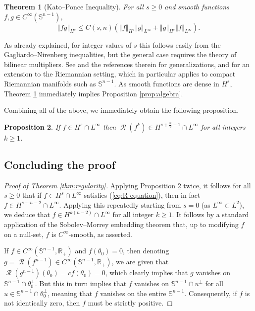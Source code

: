 \documentclass[11pt]{article}
\newtheorem{thm}{Theorem}[section]
\newtheorem{proposition}[thm]{Proposition}
\theoremstyle{definition}
\theoremstyle{proof}
\DeclareMathOperator{\+}{\mathop{\tilde{+}}}
\DeclareMathOperator{\Rad}{\mathcal{R}}
\newcommand{\norm}[1]{\left\Vert#1\right\Vert}
\newcommand{\brac}[1]{\left(#1\right)}
\newcommand{\R}{\mathbb{R}}
\renewcommand{\S}{\mathbb{S}}
\numberwithin{equation}{section}
\numberwithin{equation}{section}
\begin{document}
\begin{thm}[Kato--Ponce Inequality] \label{thm:Kato-Ponce}
For all $s \geq 0$ and smooth functions $f, g \in C^\infty(\S^{n-1})$,
\[
\norm{f g}_{H^s} \leq C(s,n) \brac{ \norm{f}_{H^s} \norm{g}_{L^\infty} + \norm{g}_{H^s} \norm{f}_{L^\infty} } .
\]
\end{thm}
As already explained, for integer values of $s$ this follows easily from the Gagliardo--Nirenberg inequalities, but the general case requires the theory of bilinear multipliers. See \cite[Theorem 7.6.1]{Grafakaos-ModernFourierAnalysis3rdEd} and the references therein for generalizations, and \cite[Theorem 25]{CoulhonEtAl-SobolevAlgebras} for an extension to the Riemannian setting, which in particular applies to compact Riemannian manifolds such as $\S^{n-1}$. 
As smooth functions are dense in $H^s$, Theorem \ref{thm:Kato-Ponce} immediately implies Proposition \ref{prop:algebra}. 


\medskip

Combining all of the above, we immediately obtain the following proposition. 
\begin{proposition} \label{prop:Rfk}
If $f \in H^{s} \cap L^\infty$ then $\Rad(f^k) \in H^{s + \frac{n}{2} - 1} \cap L^\infty$ for all integers $k \geq 1$. 
\end{proposition}

\subsection{Concluding the proof}

\begin{proof}[Proof of Theorem \ref{thm:regularity}]
Applying Proposition \ref{prop:Rfk} twice, it follows for all $s\geq 0$ that if $f \in H^s \cap L^\infty$ satisfies (\ref{eq:R-equation}), then in fact $f \in H^{s + n -2} \cap L^\infty$. Applying this repeatedly starting from $s=0$ (as $L^\infty \subset L^2$), we deduce that $f \in H^{k (n-2)} \cap L^\infty$ for all integer $k \geq 1$. It follows by a standard application of the Sobolev--Morrey embedding theorem \cite[Theorem 6.3]{HebeyRobert-SobolevSpacesOnManifolds} that, up to modifying $f$ on a null-set,  $f$ is $C^\infty$-smooth, as asserted. 

If $f \in C^\infty(\S^{n-1},\R_+)$ and $f(\theta_0) = 0$, then denoting $g = \Rad(f^{n-1}) \in C^\infty(\S^{n-1},\R_+)$, we are given that $\Rad(g^{n-1})(\theta_0) = c f(\theta_0) = 0$, which clearly implies that $g$ vanishes on $\S^{n-1} \cap \theta_0^{\perp}$. But this in turn implies that $f$ vanishes on $\S^{n-1} \cap u^{\perp}$ for all $u \in \S^{n-1} \cap \theta_0^{\perp}$, meaning that $f$ vanishes on the entire $\S^{n-1}$. Consequently, if $f$ is not identically zero, then $f$ must be strictly positive. 
\end{proof}
\end{document}
